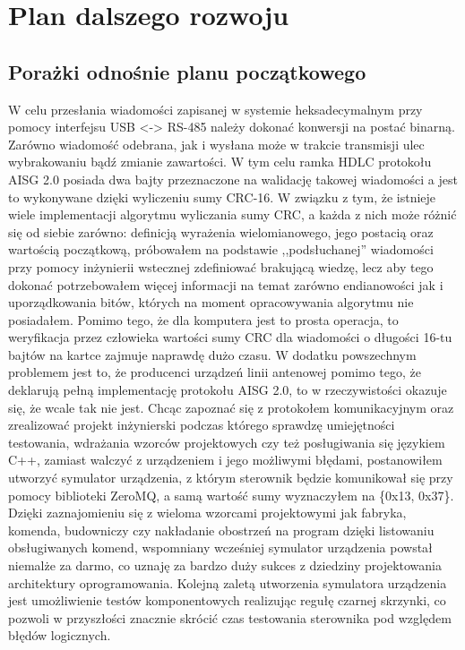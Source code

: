 \chapter{Plan dalszego rozwoju}
\section{Porażki odnośnie planu początkowego}
    W celu przesłania wiadomości zapisanej w systemie heksadecymalnym przy pomocy interfejsu USB <-> RS-485
    należy dokonać konwersji na postać binarną. Zarówno wiadomość odebrana, jak i wysłana może w trakcie transmisji ulec wybrakowaniu bądź
    zmianie zawartości. W tym celu ramka HDLC protokołu AISG 2.0 posiada dwa bajty przeznaczone na walidację takowej wiadomości a jest to wykonywane
    dzięki wyliczeniu sumy CRC-16. W związku z tym, że istnieje wiele implementacji algorytmu wyliczania sumy CRC, a każda z nich może różnić się od siebie zarówno:
    definicją wyrażenia wielomianowego, jego postacią oraz wartością początkową, próbowałem na podstawie ,,podsłuchanej'' wiadomości przy pomocy
    inżynierii wstecznej zdefiniować brakującą wiedzę, lecz aby tego dokonać potrzebowałem więcej informacji na temat zarówno endianowości
    jak i uporządkowania bitów, których na moment opracowywania algorytmu nie posiadałem. Pomimo tego, że dla komputera jest to prosta operacja, to weryfikacja przez człowieka
    wartości sumy CRC dla wiadomości o długości 16-tu bajtów na kartce zajmuje naprawdę dużo czasu. W dodatku powszechnym problemem jest to, że 
    producenci urządzeń linii antenowej pomimo tego, że deklarują pełną implementację protokołu AISG 2.0, to w rzeczywistości okazuje się, że
    wcale tak nie jest. Chcąc zapoznać się z protokołem komunikacyjnym oraz zrealizować projekt inżynierski podczas którego sprawdzę umiejętności testowania,
    wdrażania wzorców projektowych czy też posługiwania się językiem C++, zamiast walczyć z urządzeniem i jego możliwymi błędami, postanowiłem
    utworzyć symulator urządzenia, z którym sterownik będzie komunikował się przy pomocy biblioteki ZeroMQ, a samą wartość sumy wyznaczyłem na \{0x13, 0x37\}. 
    Dzięki zaznajomieniu się z wieloma wzorcami projektowymi jak fabryka, komenda, budowniczy czy nakładanie obostrzeń na program dzięki listowaniu obsługiwanych komend, 
    wspomniany wcześniej symulator urządzenia powstał niemalże za darmo, co uznaję za bardzo duży sukces z dziedziny projektowania architektury oprogramowania.
    Kolejną zaletą utworzenia symulatora urządzenia jest umożliwienie testów komponentowych realizując regułę czarnej skrzynki, co pozwoli w przyszłości
    znacznie skrócić czas testowania sterownika pod względem błędów logicznych.
